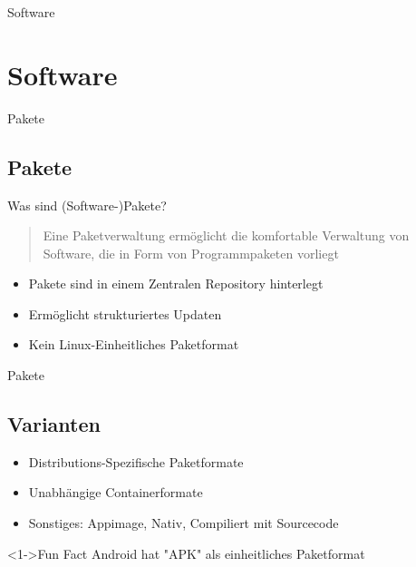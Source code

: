 
\begin{frame}{Software}
    \section{Software}\label{sec:software}
\end{frame}


\begin{frame}{Pakete}
    \subsection{Pakete}\label{subsec:pakete}

    Was sind (Software-)Pakete?

    \vspace{0.5cm}
    \begin{quote}
        Eine Paketverwaltung ermöglicht die komfortable Verwaltung von Software, die in Form von Programmpaketen vorliegt
    \end{quote}

    \begin{itemize}
        \item Pakete sind in einem Zentralen Repository hinterlegt
        \item Ermöglicht strukturiertes Updaten
        \item Kein Linux-Einheitliches Paketformat
    \end{itemize}
\end{frame}

\begin{frame}{Pakete}
    \subsection{Varianten}\label{subsec:varianten}

    \begin{itemize}
        \item Distributions-Spezifische Paketformate
        \item Unabhängige Containerformate
        \item Sonstiges: Appimage, Nativ, Compiliert mit Sourcecode
    \end{itemize}

    \vspace{0.5cm}
    \begin{exampleblock}<1->{Fun Fact}
        Android hat "APK" als einheitliches Paketformat
    \end{exampleblock}

\end{frame}

